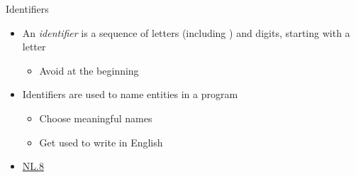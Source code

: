 \begin{frame}[fragile]{Identifiers}

  \begin{itemize}
  \item An \textit{identifier} is a sequence of letters (including \code{_}) and
    digits, starting with a letter
    \begin{itemize}
    \item Avoid \code{_} at the beginning
    \end{itemize} 

  \item Identifiers are used to name entities in a program
    \begin{itemize}
    \item Choose meaningful names
    \item Get used to write in English
    \end{itemize}
  \item \href{https://isocpp.github.io/CppCoreGuidelines/CppCoreGuidelines#nl8-use-a-consistent-naming-style}{NL.8}
  \end{itemize}

\end{frame}

